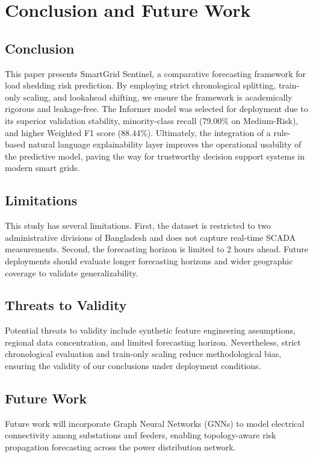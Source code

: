 \section{Conclusion and Future Work}
\subsection{Conclusion}
This paper presents SmartGrid Sentinel, a comparative forecasting framework for load shedding risk prediction. By employing strict chronological splitting, train-only scaling, and lookahead shifting, we ensure the framework is academically rigorous and leakage-free. The Informer model was selected for deployment due to its superior validation stability, minority-class recall (79.00\% on Medium-Risk), and higher Weighted F1 score (88.44\%). Ultimately, the integration of a rule-based natural language explainability layer improves the operational usability of the predictive model, paving the way for trustworthy decision support systems in modern smart grids.

\subsection{Limitations}
This study has several limitations. First, the dataset is restricted to two administrative divisions of Bangladesh and does not capture real-time SCADA measurements. Second, the forecasting horizon is limited to 2 hours ahead. Future deployments should evaluate longer forecasting horizons and wider geographic coverage to validate generalizability.

\subsection{Threats to Validity}
Potential threats to validity include synthetic feature engineering assumptions, regional data concentration, and limited forecasting horizon. Nevertheless, strict chronological evaluation and train-only scaling reduce methodological bias, ensuring the validity of our conclusions under deployment conditions.

\subsection{Future Work}
Future work will incorporate Graph Neural Networks (GNNs) to model electrical connectivity among substations and feeders, enabling topology-aware risk propagation forecasting across the power distribution network.
